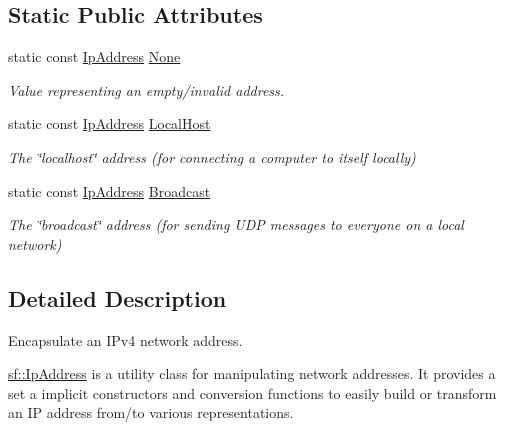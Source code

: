 \subsection*{Static Public Attributes}
\begin{DoxyCompactItemize}
\item 
\hypertarget{classsf_1_1_ip_address_a4619b4abbe3c8fef056e7299db967404}{static const \hyperlink{classsf_1_1_ip_address}{Ip\+Address} \hyperlink{classsf_1_1_ip_address_a4619b4abbe3c8fef056e7299db967404}{None}}\label{classsf_1_1_ip_address_a4619b4abbe3c8fef056e7299db967404}

\begin{DoxyCompactList}\small\item\em Value representing an empty/invalid address. \end{DoxyCompactList}\item 
\hypertarget{classsf_1_1_ip_address_a594d3a8e2559f8fa8ab0a96fa597333b}{static const \hyperlink{classsf_1_1_ip_address}{Ip\+Address} \hyperlink{classsf_1_1_ip_address_a594d3a8e2559f8fa8ab0a96fa597333b}{Local\+Host}}\label{classsf_1_1_ip_address_a594d3a8e2559f8fa8ab0a96fa597333b}

\begin{DoxyCompactList}\small\item\em The \char`\"{}localhost\char`\"{} address (for connecting a computer to itself locally) \end{DoxyCompactList}\item 
\hypertarget{classsf_1_1_ip_address_aa93d1d57b65d243f2baf804b6035465c}{static const \hyperlink{classsf_1_1_ip_address}{Ip\+Address} \hyperlink{classsf_1_1_ip_address_aa93d1d57b65d243f2baf804b6035465c}{Broadcast}}\label{classsf_1_1_ip_address_aa93d1d57b65d243f2baf804b6035465c}

\begin{DoxyCompactList}\small\item\em The \char`\"{}broadcast\char`\"{} address (for sending U\+D\+P messages to everyone on a local network) \end{DoxyCompactList}\end{DoxyCompactItemize}


\subsection{Detailed Description}
Encapsulate an I\+Pv4 network address. 

\hyperlink{classsf_1_1_ip_address}{sf\+::\+Ip\+Address} is a utility class for manipulating network addresses. It provides a set a implicit constructors and conversion functions to easily build or transform an I\+P address from/to various representations.

